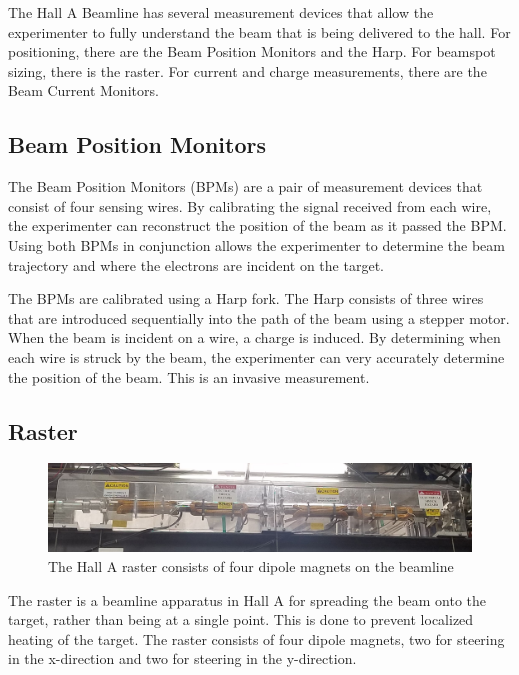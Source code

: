 
The Hall A Beamline has several measurement devices that allow the experimenter to fully understand the beam that is being delivered to the hall. For positioning, there are the Beam Position Monitors and the Harp. For beamspot sizing, there is the raster. For current and charge measurements, there are the Beam Current Monitors.

\subsection{Beam Position Monitors}

The Beam Position Monitors (BPMs) are a pair of measurement devices that consist of four sensing wires. By calibrating the signal received from each wire, the experimenter can reconstruct the position of the beam as it passed the BPM. Using both BPMs in conjunction allows the experimenter to determine the beam trajectory and where the electrons are incident on the target.

The BPMs are calibrated using a Harp fork. The Harp consists of three wires that are introduced sequentially into the path of the beam using a stepper motor. When the beam is incident on a wire, a charge is induced. By determining when each wire is struck by the beam, the experimenter can very accurately determine the position of the beam. This is an invasive measurement.

\subsection{Raster}
\begin{figure}
	\includegraphics[width=\linewidth]{./chap2-exp/fig/raster_pic.jpg}
	\caption{The Hall A raster consists of four dipole magnets on the beamline}
	\label{fig:raster}
\end{figure}

The raster is a beamline apparatus in Hall A for spreading the beam onto the target, rather than being at a single point. This is done to prevent localized heating of the target. The raster consists of four dipole magnets, two for steering in the x-direction and two for steering in the y-direction.


